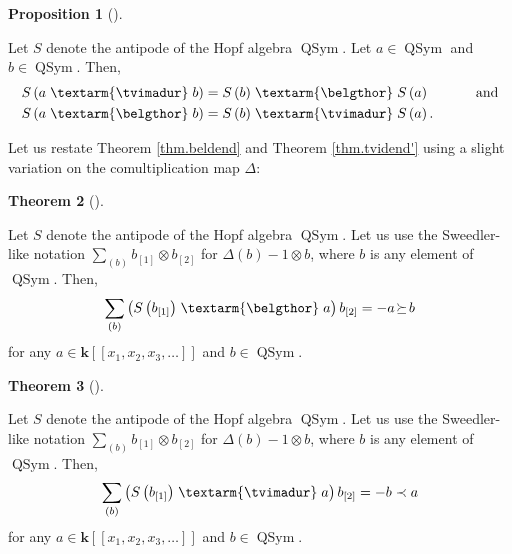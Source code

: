 \documentclass[numbers=enddot,12pt,final,onecolumn,notitlepage]{scrartcl}%
\theoremstyle{definition}
\newtheorem{theo}{Theorem}[section]
\newenvironment{theorem}[1][]
{\begin{theo}[#1]\begin{leftbar}}
{\end{leftbar}\end{theo}}
\newtheorem{prop}[theo]{Proposition}
\newenvironment{proposition}[1][]
{\begin{prop}[#1]\begin{leftbar}}
{\end{leftbar}\end{prop}}
\newenvironment{verlong}{}{}
\newenvironment{noncompile}{}{}
\newcommand{\tvi}{\left. \textarm{\tvimadur} \right.}
\newcommand{\bel}{\left. \textarm{\belgthor} \right.}
\let\sumnonlimits\sum
\renewcommand{\sum}{\sumnonlimits\limits}
\begin{document}
\begin{verlong}
\begin{noncompile}
\begin{proposition}
\label{prop.tvibel.antipode}Let $S$ denote the antipode of the Hopf algebra
$\operatorname*{QSym}$. Let $a\in\operatorname*{QSym}$ and $b\in
\operatorname*{QSym}$. Then,%
\begin{align*}
S\left(  a\tvi b\right)   &  =S\left(  b\right)  \bel S\left(  a\right)
\ \ \ \ \ \ \ \ \ \ \text{and}\\
S\left(  a\bel b\right)   &  =S\left(  b\right)  \tvi S\left(  a\right)  .
\end{align*}

\end{proposition}
\end{noncompile}

\begin{noncompile}
Let us restate Theorem \ref{thm.beldend} and Theorem \ref{thm.tvidend'} using
a slight variation on the comultiplication map $\Delta$:

\begin{theorem}
\label{thm.beldend.Del'}Let $S$ denote the antipode of the Hopf algebra
$\operatorname*{QSym}$. Let us use the Sweedler-like notation $\sum_{\left(
b\right)  }b_{\left[  1\right]  }\otimes b_{\left[  2\right]  }$ for
$\Delta\left(  b\right)  -1\otimes b$, where $b$ is any element of
$\operatorname*{QSym}$. Then,%
\[
\sum_{\left(  b\right)  }\left(  S\left(  b_{\left[  1\right]  }\right)
\bel
a\right)  b_{\left[  2\right]  }=-a\mathfrak{\left.  \succeq\right.  }b
\]
for any $a\in\mathbf{k}\left[  \left[  x_{1},x_{2},x_{3},\ldots\right]
\right]  $ and $b\in\operatorname*{QSym}$.
\end{theorem}

\begin{theorem}
\label{thm.tvidend'.Del'}Let $S$ denote the antipode of the Hopf algebra
$\operatorname*{QSym}$. Let us use the Sweedler-like notation $\sum_{\left(
b\right)  }b_{\left[  1\right]  }\otimes b_{\left[  2\right]  }$ for
$\Delta\left(  b\right)  -1\otimes b$, where $b$ is any element of
$\operatorname*{QSym}$. Then,%
\[
\sum_{\left(  b\right)  }\left(  S\left(  b_{\left[  1\right]  }\right)
\tvi
a\right)  b_{\left[  2\right]  }=-b\left.  \prec\right.  a
\]
for any $a\in\mathbf{k}\left[  \left[  x_{1},x_{2},x_{3},\ldots\right]
\right]  $ and $b\in\operatorname*{QSym}$.
\end{theorem}


\end{noncompile}
\end{verlong}
\end{document}
